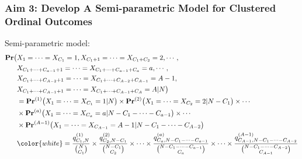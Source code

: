 \documentclass[hyperref={bookmarks=false},aspectratio=169]{beamer}
\begin{document}
\begin{frame}
\frametitle{Aim 3: Develop A Semi-parametric Model for Clustered Ordinal Outcomes}

\alert{Semi-parametric model}:
\begin{equation*}\label{M:SPforOrdinal2}
\begin{split}
    \boldsymbol{\Pr} \big( & X_1 = \dots = X_{C_1} = 1,  X_{C_1 + 1} = \dots = X_{C_1 + C_2} = 2, \cdots, \\
   & X_{C_1 + \dots + C_{a-1} + 1} = \dots = X_{C_1 + \cdots + C_{a-1} +  C_{a}} = a, \cdots, \\
   & X_{C_1 + \dots + C_{A-2} + 1} = \dots = X_{C_1 + \dots + C_{A-2} +  C_{A-1}} = A-1, \\
   & X_{C_1 + \dots + C_{A-1} + 1} = \dots = X_{C_1 + \dots + C_{A-1} +  C_{A}} = A | N \big) \\
   & = {\boldsymbol{\Pr}}^{(1)} \big( X_1 = \dots = X_{C_1} = 1 | N \big) \times {\boldsymbol{\Pr}}^{(2)} \big(X_{1} = \dots = X_{C_2} = 2 | N - C_1\big) \times \cdots \\
   & \times {\boldsymbol{\Pr}}^{(a)} \big(X_{1} = \dots = X_{C_{a}} = a | N - C_1 - \cdots - C_{a-1} \big) \times \cdots \\
   & \times {\boldsymbol{\Pr}}^{(A-1)} \big(X_{1} = \dots = X_{C_{A-1}} = A-1 | N - C_1 - \cdots - C_{A-2} \big) \\
   & {\color{white} = \dfrac{q^{(1)}_{C_1,N}}{\binom{N}{C_1}} \times \dfrac{q^{(2)}_{C_2,N - C_1}}{\binom{N - C_1}{C_2}} \times \cdots \times \dfrac{q^{(a)}_{C_{a},N - C_1 - \cdots - C_{a-1}}}{\binom{N - C_1 - \cdots - C_{a-1}}{C_a}} \times \cdots \times \dfrac{q^{(A-1)}_{C_{A-1},N - C_1 - \cdots - C_{A-2}}}{\binom{N - C_1 - \cdots - C_{A-2}}{C_{A-1}}} }
\end{split}
\end{equation*}

\end{frame}
\end{document}
